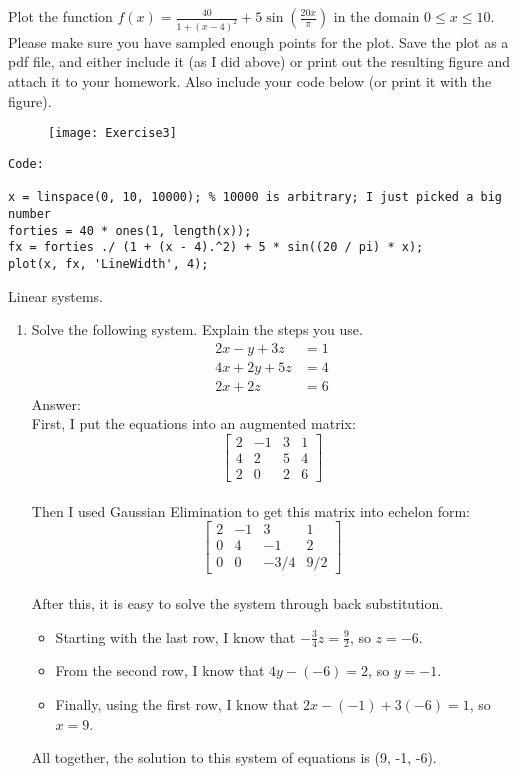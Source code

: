 \documentclass[11pt]{amsart}
\begin{document}
{\begin{enumerate}
{Plot the function $f(x) =  \frac{40}{1 + (x-4)^2} + 5\sin\left( \frac{20x}{\pi} \right)$ in the domain $0 \leq x \leq 10$. Please make
sure you have sampled enough points for the plot. Save the plot as a pdf file, and either include it (as I did above) or 
print out the resulting figure and attach it to your homework. Also include your code below (or print it with the figure). 

\begin{figure}[H]
\texttt{[image: Exercise3]}
\end{figure}

\begin{verbatim}
Code: 

x = linspace(0, 10, 10000); % 10000 is arbitrary; I just picked a big number
forties = 40 * ones(1, length(x));
fx = forties ./ (1 + (x - 4).^2) + 5 * sin((20 / pi) * x);
plot(x, fx, 'LineWidth', 4);

\end{verbatim}

\bigskip

\item[Problem 4:] Linear systems. 
\bigskip

\begin{enumerate}
\item Solve the following system. Explain the steps you use. 
\[
\begin{aligned}
2x-y + 3z &= 1 \\
4x+2y+5z & = 4\\
2x + 2z & = 6
\end{aligned}
\]
Answer:  \\
First, I put the equations into an augmented matrix: \\
$$
  \left[\begin{array}{rrr|r}
    2 & -1 & 3 & 1 \\
    4 & 2 & 5 & 4 \\
    2 & 0 & 2 & 6
  \end{array}\right]
$$ \\
Then I used Gaussian Elimination to get this matrix into echelon form: \\
$$
  \left[\begin{array}{rrr|r}
    2 & -1 & 3 & 1 \\
    0 & 4 & -1 & 2 \\
    0 & 0 & -3/4 & 9/2
  \end{array}\right]
$$ \\
After this, it is easy to solve the system through back substitution. \\
\begin{itemize}
\item Starting with the last row, I know that $-\frac{3}{4}z = \frac{9}{2}$, so $z = -6$.
\item From the second row, I know that $4y - (-6) = 2$, so $y = -1$.
\item Finally, using the first row, I know that $2x - (-1) + 3(-6) = 1$, so $x = 9$. \\
\end{itemize}
All together, the solution to this system of equations is (9, -1, -6). 
\bigskip 


\end{enumerate}}
\end{enumerate}}
\end{document}
